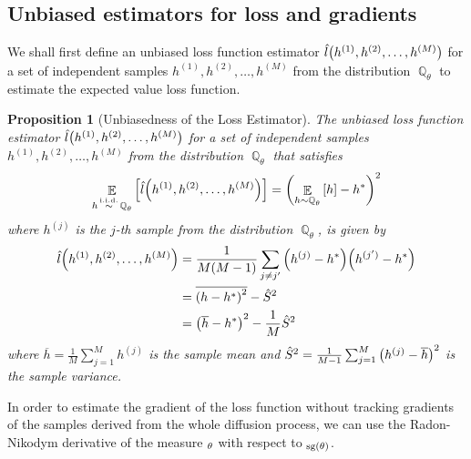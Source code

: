 \documentclass{article}
\theoremstyle{plain}
\newtheorem{proposition}[theorem]{Proposition}
\theoremstyle{definition}
\theoremstyle{remark}
\DeclareMathOperator{\Q}{\mathbb{Q}}
\let\P\relax
\DeclareMathOperator{\P}{\mathbb{P}}
\DeclareMathOperator{\E}{\mathbb{E}}
\DeclareMathOperator{\sg}{\mathrm{sg}}
\DeclareMathOperator{\iid}{\overset{\mathrm{i.i.d.}}{\sim}}
\begin{document}
\subsection{Unbiased estimators for loss and gradients}

We shall first define an unbiased loss function estimator $\hat{l}\qty(h^{(1)}, h^{(2)}, \dots, h^{(M)})$ for a set of independent samples $h^{(1)}, h^{(2)}, \dots, h^{(M)}$ from the distribution $\Q_\theta$ to estimate the expected value loss function.

\begin{proposition}[Unbiasedness of the Loss Estimator]\label{prop:unbiasedness_loss}
    The unbiased loss function estimator $\hat{l}\qty(h^{(1)}, h^{(2)}, \dots, h^{(M)})$ for a set of independent samples $h^{(1)}, h^{(2)}, \dots, h^{(M)}$ from the distribution $\Q_\theta$ that satisfies
    \begin{equation}
        \E_{h\iid \Q_\theta}\qty[\hat{l}\qty(h^{(1)}, h^{(2)}, \dots, h^{(M)})] = \qty(\E_{h\sim \Q_\theta}\qty[h]-h^*)^2
    \end{equation}
    where $h^{(j)}$ is the $j$-th sample from the distribution $\Q_\theta$, is given by
    \begin{equation}
        \begin{aligned}
            \hat{l}\qty(h^{(1)}, h^{(2)}, \dots, h^{(M)}) &= \frac{1}{M(M-1)}\sum_{j\neq j'} \qty(h^{(j)} - h^*)\qty(h^{(j')} - h^*) \\
            &= \overline{\qty(h-h^*)^2} - \hat{S}^2 \\
            &= \qty(\overline{h}-h^*)^2 - \frac{1}{M} \hat{S}^2
        \end{aligned}
    \end{equation}
    where $\overline{h} = \frac{1}{M}\sum_{j=1}^M h^{(j)}$ is the sample mean and $\hat{S}^2 = \frac{1}{M-1}\sum_{j=1}^M \qty(h^{(j)} - \overline{h})^2$ is the sample variance.
\end{proposition}

In order to estimate the gradient of the loss function without tracking gradients of the samples derived from the whole diffusion process, we can use the Radon-Nikodym derivative of the measure $\P_\theta$ with respect to $\P_{\sg(\theta)}$.
\end{document}
